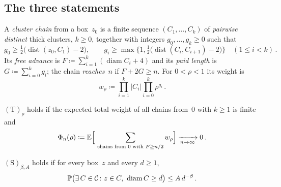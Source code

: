 \documentclass[11pt,letterpaper]{article}
\DeclareMathOperator{\diam}{diam}
\DeclareMathOperator{\dist}{dist}
\begin{document}
\subsection{The three statements}

\begin{definition}
\label{def:chain}
A \emph{cluster chain} from a box~$z_0$ is a finite sequence $(C_1,\dots,C_k)$ of \emph{pairwise distinct} thick clusters, $k\ge0$, together with integers $g_0,\dots,g_k\ge0$ such that
\begin{equation}
\label{eq:gaps}
  g_0\ge\tfrac12\bigl(\dist(z_0,C_1)-2\bigr),\qquad g_i\ge\max\bigl\{1,\tfrac12\bigl(\dist(C_i,C_{i+1})-2\bigr)\bigr\}\quad(1\le i<k)\,.
\end{equation}
Its \emph{free advance} is $F\coloneqq\sum_{i=1}^k(\diam C_i+4)$ and its \emph{paid length} is $G\coloneqq\sum_{i=0}^kg_i$; the chain \emph{reaches}~$n$ if $F+2G\ge n$. For $0<\rho<1$ its weight is
\begin{equation*}
  w_\rho\coloneqq\prod_{i=1}^k\lvert C_i\rvert\prod_{i=0}^k\rho^{g_i}\,.
\end{equation*}
\end{definition}

\begin{definition}
\label{def:T}
$\mathrm{(T)}_\rho$ holds if the expected total weight of all chains from~$0$ with $k\ge1$ is finite and
\begin{equation}
\label{eq:T}
  \Phi_n(\rho)\coloneqq\mathbb E\Bigl[\ \sum_{\text{chains from }0\text{ with }F\ge n/2}w_\rho\Bigr]\xrightarrow[n\to\infty]{}0\,.
\end{equation}
\end{definition}

\begin{definition}
\label{def:S}
$\mathrm{(S)}_{\beta,A}$ holds if for every box~$z$ and every $d\ge1$,
\begin{equation}
\label{eq:S}
  \P\bigl(\exists\,C\in\mathcal C\colon z\in C,\ \diam C\ge d\bigr)\le A\,d^{-\beta}\,.
\end{equation}
\end{definition}
\end{document}
